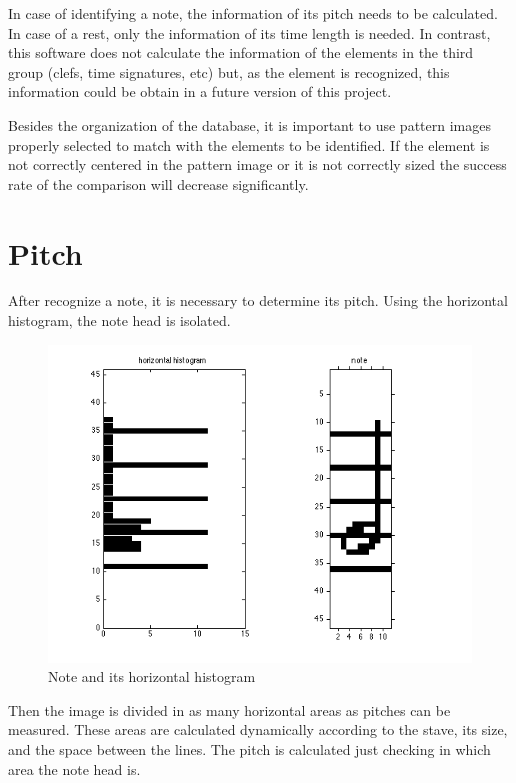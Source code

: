\documentclass[10pt, a4paper]{article}
\begin{document}
In case of identifying a note, the information of its pitch needs to be calculated. In case of a rest, only the information of its time length is needed. In contrast, this software does not calculate the information of the elements in the third group (clefs, time signatures, etc) but, as the element is recognized, this information could be obtain in a future version of this project.

Besides the organization of the database, it is important to use pattern images properly selected to match with the elements to be identified. If the element is not correctly centered in the pattern image or it is not correctly sized the success rate of the comparison will decrease significantly.

\section{Pitch}

After recognize a note, it is necessary to determine its pitch.  Using the horizontal histogram, the note head is isolated.

\begin{figure}[h!]
  \centering
    \includegraphics[scale=0.35]{./img/img5.png}
  \caption{Note and its horizontal histogram}
  \label{fig5}
\end{figure}

Then the image is divided in as many horizontal areas as pitches can be measured. These areas are calculated dynamically according to the stave, its size, and the space between the lines. The pitch is calculated just checking in which area the note head is.
\end{document}
